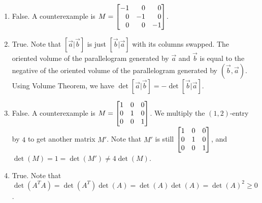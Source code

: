 \begin{exercises}
\begin{problist}
\begin{solution}
\begin{enumerate}
				\item False. A counterexample is
					$M=\mat{-1 & 0 & 0 \\ 0 & -1 & 0 \\ 0 & 0 & -1}$.

				\item True. Note that $[\vec a|\vec b]$ is just
					$[\vec b|\vec a]$ with its columns swapped. The oriented volume
					of the parallelogram generated by $\vec a$ and $\vec b$ is equal
					to the negative of the oriented volume of the parallelogram generated
					by $(\vec b,\vec a)$. Using Volume Theorem, we have $\det[\vec
					a|\vec b]=-\det[\vec b|\vec a]$.

				\item False. A counterexample is
					$M=\mat{1 & 0 & 0 \\ 0 & 1 & 0 \\ 0 & 0 & 1}$. We multiply the
					$(1,2)$-entry by $4$ to get another matrix $M'$. Note that
					$M'$ is still $\mat{1 & 0 & 0 \\ 0 & 1 & 0 \\ 0 & 0 & 1 }$, and
					$\det(M)=1=\det(M')\ne 4\det(M)$.

				\item True. Note that
					$\det(A^{T}A)=\det(A^{T})\det(A)=\det(A)\det(A)=\det(A)^{2}\ge
					0$.
			\end{enumerate}
		\end{solution}
	\end{problist}
\end{exercises} 